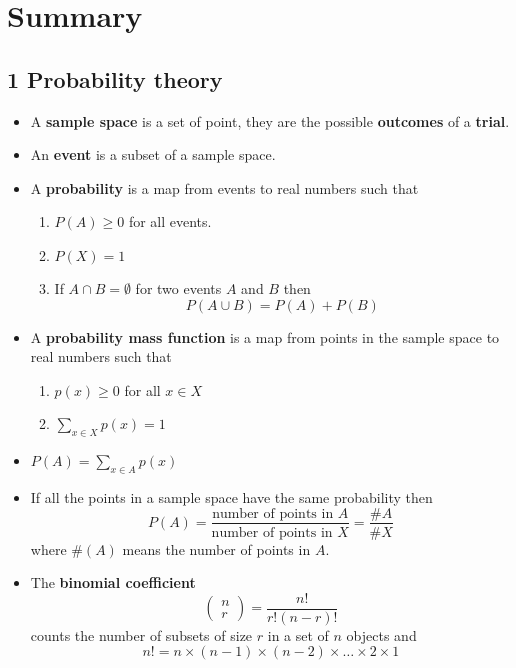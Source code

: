 
\ifind
\section*{Summary}
\else
\subsection*{1 Probability theory}
\fi

\begin{itemize}
\item A \textbf{sample space} is a set of point, they are the possible \textbf{outcomes} of a \textbf{trial}.
\item An \textbf{event} is a subset of a sample space.
\item A \textbf{probability} is a map from events to real numbers such that
  \begin{enumerate}
    \item $P(A)\ge 0$ for all events.
    \item $P(X)=1$
    \item If $A\cap B=\emptyset$ for two events $A$ and $B$ then 
      \begin{equation}
        P(A\cup B)=P(A)+P(B)
      \end{equation}
\end{enumerate}
\item A \textbf{probability mass function} is a map from points in the sample space to real numbers such that
  \begin{enumerate}
\item $p(x)\ge 0$ for all $x\in X$
\item $\sum_{x\in X} p(x)=1$
  \end{enumerate}
\item $P(A)=\sum_{x\in A}p(x)$
\item If all the points in a sample space have the same probability then
  \begin{equation}
P(A)=\frac{\mbox{number of points in }A}{\mbox{number of points in }X}=\frac{\#A}{\#{X}}
  \end{equation}
  where $\#(A)$ means the number of points in $A$.
  \item The \textbf{binomial coefficient}
\begin{equation}
\left(\begin{array}{c}n\\r\end{array}\right)=\frac{n!}{r!(n-r)!}
\end{equation}
counts the number of subsets of size $r$ in a set of $n$ objects and 
\begin{equation}
n!=n\times (n-1)\times (n-2)\times \ldots \times 2 \times 1
\end{equation}
\end{itemize}

